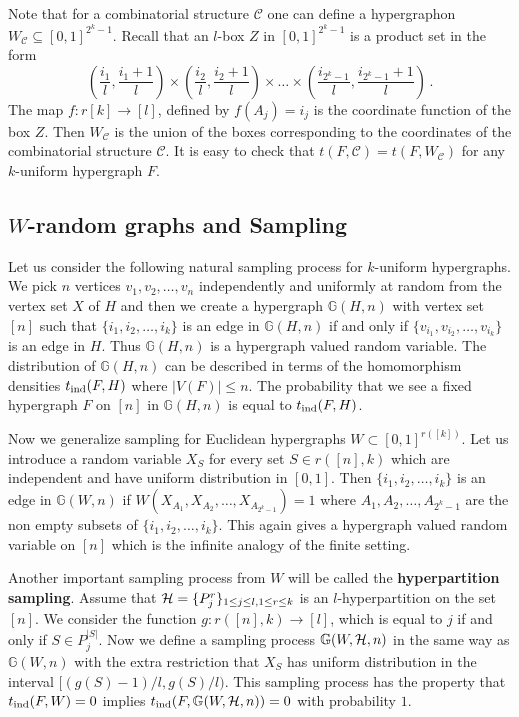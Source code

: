 \documentclass [11pt] {article}
\def\cH{\mbox{$\cal H$}}
\def\to{\rightarrow}
\begin{document}
Note that for a combinatorial structure $\mathcal{C}$ one can define a
hypergraphon $W_{\mathcal{C}}\subseteq [0,1]^{2^k-1}$.
Recall that an $l$-box $Z$ in $[0,1]^{2^k-1}$ is 
a product set in the form
$$\left(\frac{i_1}{l}, \frac{i_1+1}{l}\right)\times
\left(\frac{i_2}{l}, \frac{i_2+1}{l}\right) \times \dots \times
\left(\frac{i_{2^k-1}}{l}, \frac{i_{2^k-1}+1}{l}\right)\,.$$
The map $f:r[k]\to [l]$, defined by $f(A_j)=i_j$ is the coordinate
function of the box $Z$. Then $W_{\mathcal{C}}$ is the union of the boxes
corresponding to the coordinates of the combinatorial structure
$\mathcal{C}$. It is easy to check that
$t(F,\mathcal{C})=t(F,W_{\mathcal{C}})$ for any $k$-uniform hypergraph
$F$.

\subsection{$W$-random graphs and Sampling}
\label{sub26}
Let us consider the following natural sampling process 
for $k$-uniform hypergraphs. We pick $n$ 
vertices $v_1,v_2,\dots,v_n$ independently and uniformly at random from the
vertex set $X$ of $H$ and then we create a hypergraph $\mathbb{G}(H,n)$ 
with vertex set $[n]$ such that $\{i_1,i_2,\dots,i_k\}$ is 
an edge in $\mathbb{G}(H,n)$ if and 
only if $\{v_{i_1},v_{i_2},\dots,v_{i_k}\}$ is an edge in $H$.
Thus $\mathbb{G}(H,n)$ is a hypergraph valued random variable. 
The distribution of $\mathbb{G}(H,n)$ can be described in terms of 
the homomorphism densities $t_{\rm ind}(F,H)$ where $|V(F)|\leq n$. 
The probability that we see a fixed hypergraph $F$ on $[n]$ 
in $\mathbb{G}(H,n)$ is equal to $t_{\rm ind}(F,H)$. 

Now we generalize sampling for Euclidean hypergraphs $W\subset
[0,1]^{r([k])}$. Let us introduce a random variable $X_S$ for every set 
$S\in r([n],k)$ which are independent and have uniform
 distribution in $[0,1]$. Then $\{i_1,i_2,\dots,i_k\}$ is an edge in
 $\mathbb{G}(W,n)$ if $W(X_{A_1},X_{A_2},\dots,X_{A_{2^k-1}})=1$ where
 $A_1,A_2,\dots,A_{2^k-1}$ are the non empty subsets of
 $\{i_1,i_2,\dots,i_k\}$.
 This again gives a hypergraph valued random variable on $[n]$ which is 
the infinite analogy of the finite setting.

Another important sampling process from $W$ will be called the 
{\bf hyperpartition sampling}. Assume that 
$\cH=\{P_j^r\}_{1\leq j\leq l,1\leq r\leq k}$ is an 
$l$-hyperpartition on the set $[n]$.
We consider the function $g:r([n],k)\to [l]$,
which is equal to $j$ if and only if $S\in P_j^{|S|}$.
 Now we define a sampling process $\mathbb{G}(W,\cH,n)$ in the 
same way as $\mathbb{G}(W,n)$ with the extra restriction that 
$X_S$ has uniform distribution in the interval $[(g(S)-1)/l,g(S)/l)$.
This sampling process has the property that 
$t_{\rm ind}(F,W)=0$ implies $t_{\rm ind}(F,\mathbb{G}(W,\cH,n))=0$ 
with probability $1$.
\end{document}
